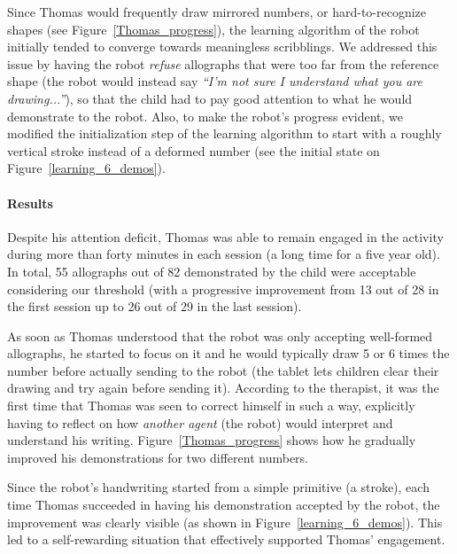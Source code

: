 \documentclass{article}
\begin{document}
Since Thomas would frequently draw mirrored numbers, or hard-to-recognize shapes
(see Figure~\ref{Thomas_progress}), the learning algorithm of the robot
initially tended to converge towards meaningless scribblings. We addressed this
issue by having the robot \emph{refuse} allographs that were too far from the
reference shape (the robot would instead say \emph{``I'm not sure I understand
what you are drawing...''}), so that the child had to pay good attention to what
he would demonstrate to the robot. Also, to make the robot's progress evident,
we modified the initialization step of the learning algorithm to start with a
roughly vertical stroke instead of a deformed number (see the initial state on
Figure~\ref{learning_6_demos}).

%

\paragraph{Results}

Despite his attention deficit, Thomas was able to remain engaged in the activity
during more than forty minutes in each session (a long time for a five year
old). In total, 55 allographs out of 82 demonstrated by the child were
acceptable considering our threshold (with a progressive improvement from 13 out
of 28 in the first session up to 26 out of 29 in the last session).

As soon as Thomas understood that the robot was only accepting well-formed
allographs, he started to focus on it and he would typically draw 5 or 6 times
the number before actually sending to the robot (the tablet lets children clear
their drawing and try again before sending it). According to the therapist, it
was the first time that Thomas was seen to correct himself in such a way,
explicitly having to reflect on how \emph{another agent} (the robot) would
interpret and understand his writing. Figure~\ref{Thomas_progress} shows how he
gradually improved his demonstrations for two different numbers.

Since the robot's handwriting started from a simple primitive (a stroke), each
time Thomas succeeded in having his demonstration accepted by the robot, the
improvement was clearly visible (as shown in Figure~\ref{learning_6_demos}).
This led to a self-rewarding situation that effectively supported Thomas'
engagement.
\end{document}
